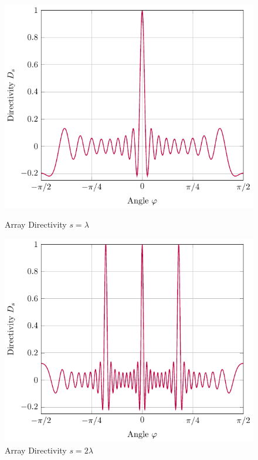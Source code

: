 \begin{figure}
    \begin{minipage}{0.49\textwidth}
    \centering
    \includegraphics[width=\textwidth]{images/3_Parametric_array/Directivity_NoSteer_Lambda.pdf}
    \caption{Array Directivity $s = \lambda$}
    \label{3_subfig:directivity_no_steer_lambda1}
    \end{minipage}
    \begin{minipage}{0.49\textwidth}
    \centering
    \includegraphics[width=\textwidth]{images/3_Parametric_array/Directivity_NoSteer_2Lambda.pdf}
    \caption{Array Directivity $s = 2\lambda$}
     \label{3_subfig:directivity_no_steer_2lambda}
    \end{minipage}
\end{figure}


